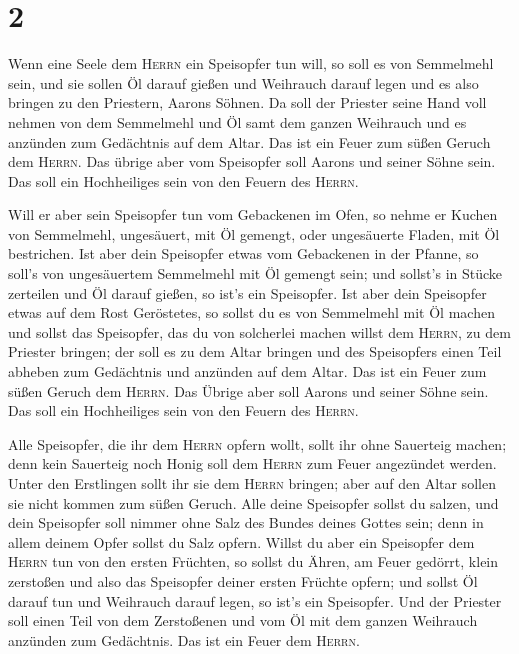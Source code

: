 \hypertarget{section-1}{%
\section{2}\label{section-1}}

 Wenn eine Seele dem \textsc{Herrn} ein Speisopfer tun
will, so soll es von Semmelmehl sein, und sie sollen Öl darauf gießen
und Weihrauch darauf legen  und es also bringen zu den
Priestern, Aarons Söhnen. Da soll der Priester seine Hand voll nehmen
von dem Semmelmehl und Öl samt dem ganzen Weihrauch und es anzünden zum
Gedächtnis auf dem Altar. Das ist ein Feuer zum süßen Geruch dem
\textsc{Herrn}.  Das übrige aber vom Speisopfer soll
Aarons und seiner Söhne sein. Das soll ein Hochheiliges sein von den
Feuern des \textsc{Herrn}.

 Will er aber sein Speisopfer tun vom Gebackenen im Ofen,
so nehme er Kuchen von Semmelmehl, ungesäuert, mit Öl gemengt, oder
ungesäuerte Fladen, mit Öl bestrichen.  Ist aber dein
Speisopfer etwas vom Gebackenen in der Pfanne, so soll's von
ungesäuertem Semmelmehl mit Öl gemengt sein;  und sollst's
in Stücke zerteilen und Öl darauf gießen, so ist's ein Speisopfer.
 Ist aber dein Speisopfer etwas auf dem Rost Geröstetes,
so sollst du es von Semmelmehl mit Öl machen  und sollst
das Speisopfer, das du von solcherlei machen willst dem \textsc{Herrn},
zu dem Priester bringen; der soll es zu dem Altar bringen 
und des Speisopfers einen Teil abheben zum Gedächtnis und anzünden auf
dem Altar. Das ist ein Feuer zum süßen Geruch dem \textsc{Herrn}.
 Das Übrige aber soll Aarons und seiner Söhne sein. Das
soll ein Hochheiliges sein von den Feuern des \textsc{Herrn}.

 Alle Speisopfer, die ihr dem \textsc{Herrn} opfern
wollt, sollt ihr ohne Sauerteig machen; denn kein Sauerteig noch Honig
soll dem \textsc{Herrn} zum Feuer angezündet werden. 
Unter den Erstlingen sollt ihr sie dem \textsc{Herrn} bringen; aber auf
den Altar sollen sie nicht kommen zum süßen Geruch.  Alle
deine Speisopfer sollst du salzen, und dein Speisopfer soll nimmer ohne
Salz des Bundes deines Gottes sein; denn in allem deinem Opfer sollst du
Salz opfern.  Willst du aber ein Speisopfer dem
\textsc{Herrn} tun von den ersten Früchten, so sollst du Ähren, am Feuer
gedörrt, klein zerstoßen und also das Speisopfer deiner ersten Früchte
opfern;  und sollst Öl darauf tun und Weihrauch darauf
legen, so ist's ein Speisopfer.  Und der Priester soll
einen Teil von dem Zerstoßenen und vom Öl mit dem ganzen Weihrauch
anzünden zum Gedächtnis. Das ist ein Feuer dem \textsc{Herrn}.

